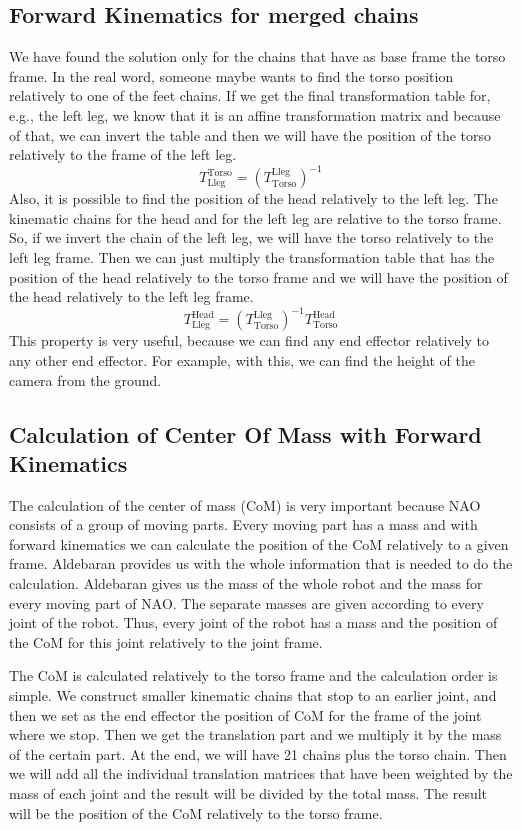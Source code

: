 \subsection{Forward Kinematics for merged chains}
We have found the solution only for the chains that have as base frame the torso frame. In the real word, someone maybe wants to find the torso position relatively to one of the feet chains. If we get the final transformation table for, e.g., the left leg, we know that it is an affine transformation matrix and because of that, we can invert the table and then we will have the position of the torso relatively to the frame of the left leg. 
\[
T^\text{Torso}_\text{Lleg} = {\left(T^\text{Lleg}_\text{Torso}\right)}^{-1}
\]
Also, it is possible to find the position of the head relatively to the left leg. The kinematic chains for the head and for the left leg are relative to the torso frame. So, if we invert the chain of the left leg, we will have the torso relatively to the left leg frame. Then we can just multiply the transformation table that has the position of the head relatively to the torso frame and we will have the position of the head relatively to the left leg frame.
\[
T^\text{Head}_\text{Lleg} = {\left(T^\text{Lleg}_\text{Torso}\right)}^{-1}T^\text{Head}_\text{Torso}
\]
This property is very useful, because we can find any end effector relatively to any other end effector. For example, with this, we can find the height of the camera from the ground.

\subsection{Calculation of Center Of Mass with Forward Kinematics}
The calculation of the center of mass (CoM) is very important because NAO consists of a group of moving parts. Every moving part has a mass and with forward kinematics we can calculate the position of the CoM relatively to a given frame. Aldebaran provides us with the whole information that is needed to do the calculation. Aldebaran gives us the mass of the whole robot and the mass for every moving part of NAO. The separate masses are given according to every joint of the robot. Thus, every joint of the robot has a mass and the position of the CoM for this joint relatively to the joint frame.

The CoM is calculated relatively to the torso frame and the calculation order is simple. We construct smaller kinematic chains that stop to an earlier joint, and then we set as the end effector the position of CoM for the frame of the joint where we stop. Then we get the translation part and we multiply it by the mass of the certain part. At the end, we will have 21 chains plus the torso chain. Then we will add all the individual translation matrices that have been weighted by the mass of each joint and the result will be divided by the total mass. The result will be the position of the CoM relatively to the torso frame.

